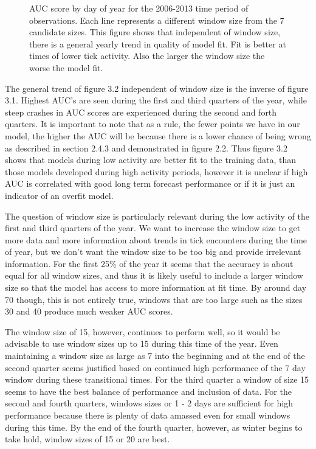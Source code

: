 \begin{figure} [!ht]
\centerline{}
\caption{AUC score by day of year for the 2006-2013 time period of observations. Each line represents a different window size from the 7 candidate sizes. This figure shows that independent of window size, there is a general yearly trend in quality of model fit. Fit is better at times of lower tick activity. Also the larger the window size the worse the model fit.}
\label{fig6}
\end{figure}

\noindent The general trend of figure 3.2 independent of window size is the inverse of figure 3.1. Highest AUC's are seen during the first and third quarters of the year, while steep crashes in AUC scores are experienced during the second and forth quarters. It is important to note that as a rule, the fewer points we have in our model, the higher the AUC will be because there is a lower chance of being wrong as described in section 2.4.3 and demonstrated in figure 2.2. Thus figure 3.2 shows that models during low activity are better fit to the training data, than those models developed during high activity periods, however it is unclear if high AUC is correlated with good long term forecast performance or if it is just an indicator of an overfit model. \newline

\noindent The question of window size is particularly relevant during the low activity of the first and third quarters of the year. We want to increase the window size to get more data and more information about trends in tick encounters during the time of year, but we don't want the window size to be too big and provide irrelevant information. For the first 25\% of the year it seems that the accuracy is about equal for all window sizes, and thus it is likely useful to include a larger window size so that the model has access to more information at fit time. By around day 70 though, this is not entirely true, windows that are too large such as the sizes 30 and 40 produce much weaker AUC scores. \newline

\noindent The window size of 15, however, continues to perform well, so it would be advisable to use window sizes up to 15 during this time of the year. Even maintaining a window size as large as 7 into the beginning and at the end of the second quarter seems justified based on continued high performance of the 7 day window during these transitional times. For the third quarter a window of size 15 seems to have the best balance of performance and inclusion of data. For the second and fourth quarters, windows sizes or 1 - 2 days are sufficient for high performance because there is plenty of data amassed even for small windows during this time. By the end of the fourth quarter, however, as winter begins to take hold, window sizes of 15 or 20 are best. \newline

